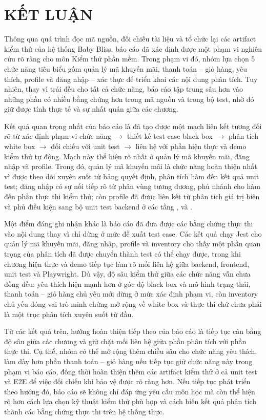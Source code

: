 \newpage
\section{\textbf{KẾT LUẬN}}

Thông qua quá trình đọc mã nguồn, đối chiếu tài liệu và tổ chức lại các artifact kiểm thử của hệ thống Baby Bliss, báo cáo đã xác định được một phạm vi nghiên cứu rõ ràng cho môn Kiểm thử phần mềm. Trong phạm vi đó, nhóm lựa chọn 5 chức năng tiêu biểu gồm quản lý mã khuyến mãi, thanh toán -- giỏ hàng, yêu thích, profile và đăng nhập -- xác thực để triển khai các nội dung phân tích. Tuy nhiên, thay vì trải đều cho tất cả chức năng, báo cáo tập trung sâu hơn vào những phần có nhiều bằng chứng hơn trong mã nguồn và trong bộ test, nhờ đó giữ được tính thực tế và sự nhất quán giữa các chương.

Kết quả quan trọng nhất của báo cáo là đã tạo được một mạch liên kết tương đối rõ từ xác định phạm vi chức năng $\rightarrow$ thiết kế test case black box $\rightarrow$ phân tích white box $\rightarrow$ đối chiếu với unit test $\rightarrow$ liên hệ với phần hiện thực và demo kiểm thử tự động. Mạch này thể hiện rõ nhất ở quản lý mã khuyến mãi, đăng nhập và profile. Trong đó, quản lý mã khuyến mãi là chức năng hoàn thiện nhất vì được theo dõi xuyên suốt từ bảng quyết định, phân tích hàm  đến kết quả unit test; đăng nhập có sự nối tiếp rõ từ phân vùng tương đương, phủ nhánh cho hàm  đến phần thực thi kiểm thử; còn profile đã được liên kết từ phân tích giá trị biên và phủ điều kiện sang bộ unit test backend ở các tầng ,  và .

Một điểm đáng ghi nhận khác là báo cáo đã đưa được các bằng chứng thực thi vào nội dung thay vì chỉ dừng ở mức đề xuất test case. Các kết quả chạy Jest cho quản lý mã khuyến mãi, đăng nhập, profile và inventory cho thấy một phần quan trọng của phân tích đã được chuyển thành test có thể chạy được, trong khi chương hiện thực và demo tiếp tục làm rõ mối liên hệ giữa backend, frontend, unit test và Playwright. Dù vậy, độ sâu kiểm thử giữa các chức năng vẫn chưa đồng đều: yêu thích hiện mạnh hơn ở góc độ black box và mô hình trạng thái, thanh toán -- giỏ hàng chủ yếu mới dừng ở mức xác định phạm vi, còn inventory chủ yếu đóng vai trò minh chứng mở rộng về white box và thực thi chứ chưa phải là một trục phân tích xuyên suốt từ đầu.

Từ các kết quả trên, hướng hoàn thiện tiếp theo của báo cáo là tiếp tục cân bằng độ sâu giữa các chương và giữ chặt mối liên hệ giữa phần phân tích với phần thực thi. Cụ thể, nhóm có thể mở rộng thêm chiều sâu cho chức năng yêu thích, làm dày hơn phần thanh toán -- giỏ hàng nếu tiếp tục giữ chức năng này trong phạm vi báo cáo, đồng thời hoàn thiện thêm các artifact kiểm thử ở cả unit test và E2E để việc đối chiếu khi bảo vệ được rõ ràng hơn. Nếu tiếp tục phát triển theo hướng đó, báo cáo sẽ không chỉ đáp ứng yêu cầu môn học mà còn thể hiện rõ hơn cách lựa chọn kỹ thuật kiểm thử phù hợp và cách biến kết quả phân tích thành các bằng chứng thực thi trên hệ thống thực.
